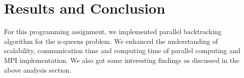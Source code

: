 \documentclass[twoside,12pt]{article}
\begin{document}
\section{Results and Conclusion}
For this programming assignment, we implemented parallel backtracking algorithm for the n-queens problem. We enhanced the understanding of scalability, communication time and computing time of parallel computing and MPI implementation. We also got some interesting findings as discussed in the above analysis section. 

     
\end{document}
